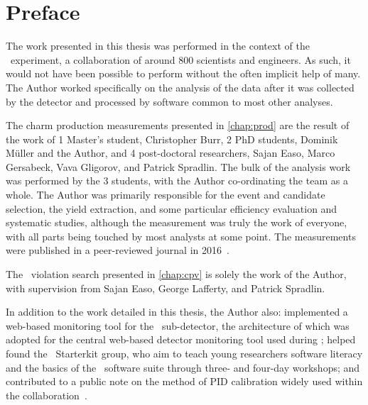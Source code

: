 \chapter{Preface}


The work presented in this thesis was performed in the context of the \lhcb\ 
experiment, a collaboration of around 800 scientists and engineers.
As such, it would not have been possible to perform without the often implicit 
help of many.
The Author worked specifically on the analysis of the data after it was 
collected by the detector and processed by software common to most other 
analyses.

The charm production measurements presented in \cref{chap:prod} are the result 
of the work of 1 Master's student, Christopher Burr, 2 PhD students, Dominik 
M\"{u}ller and the Author, and 4 post-doctoral researchers, Sajan Easo, Marco 
Gersabeck, Vava Gligorov, and Patrick Spradlin.
The bulk of the analysis work was performed by the 3 students, with the Author 
co-ordinating the team as a whole.
The Author was primarily responsible for the event and candidate selection, the 
yield extraction, and some particular efficiency evaluation and systematic 
studies, although the measurement was truly the work of everyone, with all 
parts being touched by most analysts at some point.
The measurements were published in a peer-reviewed journal in 
2016~\cite{Aaij:2015bpa}.

The \CP\ violation search presented in \cref{chap:cpv} is solely the work of 
the Author, with supervision from Sajan Easo, George Lafferty, and Patrick 
Spradlin.

In addition to the work detailed in this thesis, the Author also: implemented a 
web-based monitoring tool for the \velo\ sub-detector, the architecture of 
which was adopted for the central web-based detector monitoring tool used 
during \runtwo; helped found the \lhcb\ Starterkit group, who aim to teach 
young researchers software literacy and the basics of the \lhcb\ software suite 
through three- and four-day workshops; and contributed to a public note on the 
method of \acl*{PID} calibration widely used within the 
collaboration~\cite{Anderlini:2202412}.
